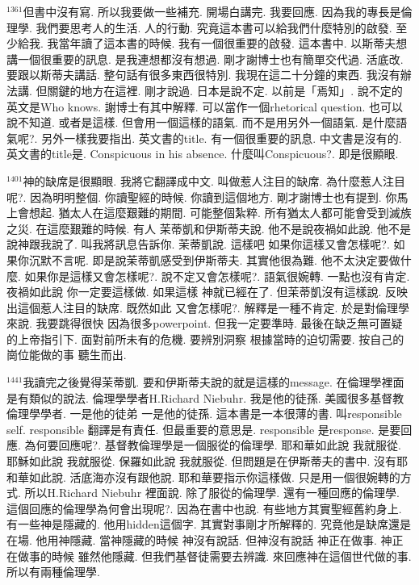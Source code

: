 \documentclass{book}
\begin{document}
$^{1361}$但書中沒有寫.
所以我要做一些補充.
開場白講完.
我要回應.
因為我的專長是倫理學.
我們要思考人的生活.
人的行動.
究竟這本書可以給我們什麼特別的啟發.
至少給我.
我當年讀了這本書的時候.
我有一個很重要的啟發.
這本書中.
以斯蒂夫想講一個很重要的訊息.
是我連想都沒有想過.
剛才謝博士也有簡單交代過.
活底改.
要跟以斯蒂夫講話.
整句話有很多東西很特別.
我現在這二十分鐘的東西.
我沒有辦法講.
但關鍵的地方在這裡.
剛才說過.
日本是說不定.
以前是「焉知」.
說不定的英文是Who knows.
謝博士有其中解釋.
可以當作一個rhetorical question.
也可以說不知道.
或者是這樣.
但會用一個這樣的語氣.
而不是用另外一個語氣.
是什麼語氣呢?.
另外一樣我要指出.
英文書的title.
有一個很重要的訊息.
中文書是沒有的.
英文書的title是.
Conspicuous in his absence.
什麼叫Conspicuous?.
即是很顯眼.

$^{1401}$神的缺席是很顯眼.
我將它翻譯成中文.
叫做惹人注目的缺席.
為什麼惹人注目呢?.
因為明明整個.
你讀聖經的時候.
你讀到這個地方.
剛才謝博士也有提到.
你馬上會想起.
猶太人在這麼艱難的期間.
可能整個紮粹.
所有猶太人都可能會受到滅族之災.
在這麼艱難的時候.
有人 茉蒂凱和伊斯蒂夫說.
他不是說夜禍如此說.
他不是說神跟我說了.
叫我將訊息告訴你.
茉蒂凱說.
這樣吧 如果你這樣又會怎樣呢?.
如果你沉默不言呢.
即是說茉蒂凱感受到伊斯蒂夫.
其實他很為難.
他不太決定要做什麼.
如果你是這樣又會怎樣呢?.
說不定又會怎樣呢?.
語氣很婉轉.
一點也沒有肯定.
夜禍如此說 你一定要這樣做.
如果這樣 神就已經在了.
但茉蒂凱沒有這樣說.
反映出這個惹人注目的缺席.
既然如此 又會怎樣呢?.
解釋是一種不肯定.
於是對倫理學來說.
我要跳得很快 因為很多powerpoint.
但我一定要準時.
最後在缺乏無可置疑的上帝指引下.
面對前所未有的危機.
要辨別洞察 根據當時的迫切需要.
按自己的崗位能做的事 聽生而出.

$^{1441}$我讀完之後覺得茉蒂凱.
要和伊斯蒂夫說的就是這樣的message.
在倫理學裡面是有類似的說法.
倫理學學者H.Richard Niebuhr.
我是他的徒孫.
美國很多基督教倫理學學者.
一是他的徒弟 一是他的徒孫.
這本書是一本很薄的書.
叫responsible self.
responsible 翻譯是有責任.
但最重要的意思是.
responsible 是response.
是要回應.
為何要回應呢?.
基督教倫理學是一個服從的倫理學.
耶和華如此說 我就服從.
耶穌如此說 我就服從.
保羅如此說 我就服從.
但問題是在伊斯蒂夫的書中.
沒有耶和華如此說.
活底海亦沒有跟他說.
耶和華要指示你這樣做.
只是用一個很婉轉的方式.
所以H.Richard Niebuhr 裡面說.
除了服從的倫理學.
還有一種回應的倫理學.
這個回應的倫理學為何會出現呢?.
因為在書中也說.
有些地方其實聖經舊約身上.
有一些神是隱藏的.
他用hidden這個字.
其實對事剛才所解釋的.
究竟他是缺席還是在場.
他用神隱藏.
當神隱藏的時候 神沒有說話.
但神沒有說話 神正在做事.
神正在做事的時候 雖然他隱藏.
但我們基督徒需要去辨識.
來回應神在這個世代做的事.
所以有兩種倫理學.
\end{document}
